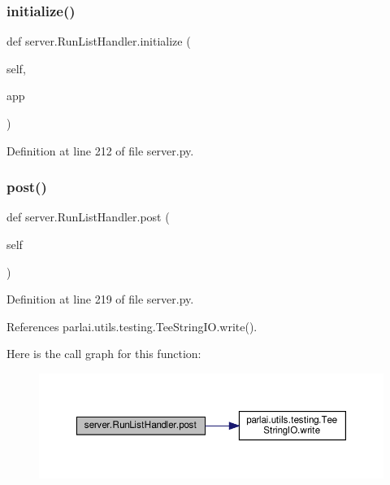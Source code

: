 \subsubsection{\texorpdfstring{initialize()}{initialize()}}
{\footnotesize\ttfamily def server.\+Run\+List\+Handler.\+initialize (\begin{DoxyParamCaption}\item[{}]{self,  }\item[{}]{app }\end{DoxyParamCaption})}



Definition at line 212 of file server.\+py.

\mbox{\label{classserver_1_1RunListHandler_aeb0b280967eb942a9c24fc5a928c85e5}} 
\subsubsection{\texorpdfstring{post()}{post()}}
{\footnotesize\ttfamily def server.\+Run\+List\+Handler.\+post (\begin{DoxyParamCaption}\item[{}]{self }\end{DoxyParamCaption})}



Definition at line 219 of file server.\+py.



References parlai.\+utils.\+testing.\+Tee\+String\+I\+O.\+write().

Here is the call graph for this function\+:
\nopagebreak
\begin{figure}[H]
\begin{center}
\leavevmode
\includegraphics[width=350pt]{classserver_1_1RunListHandler_aeb0b280967eb942a9c24fc5a928c85e5_cgraph}
\end{center}
\end{figure}


